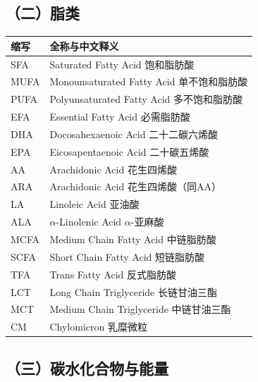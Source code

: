 \subsection*{（二）脂类}

\begin{table}[H]
\centering
\begin{tabularx}{\textwidth}{lX}
\toprule
\textbf{缩写} & \textbf{全称与中文释义} \\
\midrule
SFA & Saturated Fatty Acid \hfill 饱和脂肪酸 \\
MUFA & Monounsaturated Fatty Acid \hfill 单不饱和脂肪酸 \\
PUFA & Polyunsaturated Fatty Acid \hfill 多不饱和脂肪酸 \\
EFA & Essential Fatty Acid \hfill 必需脂肪酸 \\
DHA & Docosahexaenoic Acid \hfill 二十二碳六烯酸 \\
EPA & Eicosapentaenoic Acid \hfill 二十碳五烯酸 \\
AA & Arachidonic Acid \hfill 花生四烯酸 \\
ARA & Arachidonic Acid \hfill 花生四烯酸（同AA） \\
LA & Linoleic Acid \hfill 亚油酸 \\
ALA & $\alpha$-Linolenic Acid \hfill $\alpha$-亚麻酸 \\
MCFA & Medium Chain Fatty Acid \hfill 中链脂肪酸 \\
SCFA & Short Chain Fatty Acid \hfill 短链脂肪酸 \\
TFA & Trans Fatty Acid \hfill 反式脂肪酸 \\
LCT & Long Chain Triglyceride \hfill 长链甘油三酯 \\
MCT & Medium Chain Triglyceride \hfill 中链甘油三酯 \\
CM & Chylomicron \hfill 乳糜微粒 \\
\bottomrule
\end{tabularx}
\end{table}

\subsection*{（三）碳水化合物与能量}

